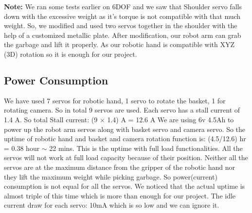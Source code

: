 \documentclass[conference]{IEEEtran}
\begin{document}
	\textbf{Note:} We ran some tests earlier on 6DOF and we saw that Shoulder servo falls down with the excessive weight as it’s torque is not compatible with that much weight. 
	So, we modified and used two servos together in the shoulder with the help of a customized metallic plate. After modification, our robot arm can grab the garbage and lift it properly. As our robotic hand is compatible with XYZ (3D) rotation so it is enough for our project. 
	
	
	\subsection{Power Consumption}
	
	We have used 7 servos for robotic hand, 1 servo to rotate the basket, 1 for rotating camera. So in total 9 servos are used. 
	Each servo has a stall current of 1.4 A. 
	So total Stall current: (9 $\times$ 1.4) A = 12.6 A
	We are using 6v 4.5Ah to power up the robot arm servos along with basket servo and camera servo.
	So the uptime of robotic hand and basket and camera rotation function is: (4.5/12.6) hr = 0.38 hour $\sim$ 22 mins.
	This is the uptime with full load functionalities. All the servos will not work at full load capacity because of their position. Neither all the servos are at the maximum distance from the gripper of the robotic hand nor they lift the maximum weight while picking garbage. So power(current) consumption is not equal for all the servos. We noticed that the actual uptime is almost triple of this time which is more than enough for our project. 
	The idle current draw for each servo: 10mA which is so low and we can ignore it.  
	
	
\end{document}
